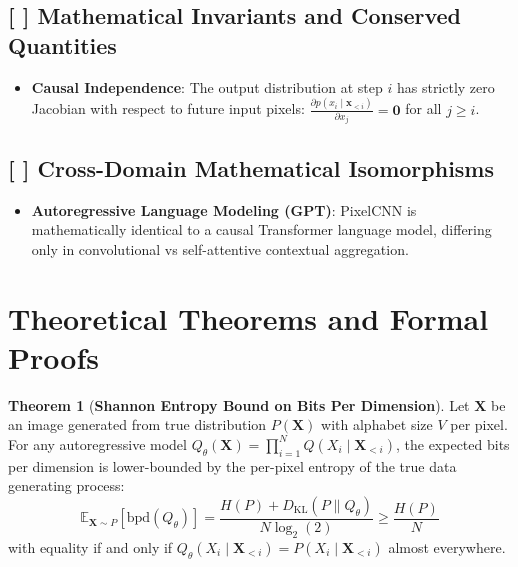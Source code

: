 \documentclass[11pt,a4paper]{article}
\theoremstyle{definition}
\newtheorem{theorem}{\textbf{Theorem}}[section]
\begin{document}
\subsection{[ ] Mathematical Invariants and Conserved Quantities}
\begin{itemize}
    \item \textbf{Causal Independence}: The output distribution at step $i$ has strictly zero Jacobian with respect to future input pixels: $\frac{\partial p(x_i \mid \mathbf{x}_{<i})}{\partial x_j} = \mathbf{0}$ for all $j \ge i$.
\end{itemize}

\subsection{[ ] Cross-Domain Mathematical Isomorphisms}
\begin{itemize}
    \item \textbf{Autoregressive Language Modeling (GPT)}: PixelCNN is mathematically identical to a causal Transformer language model, differing only in convolutional vs self-attentive contextual aggregation.
\end{itemize}

\section{Theoretical Theorems and Formal Proofs}

\begin{theorem}[\textbf{Shannon Entropy Bound on Bits Per Dimension}]
Let $\mathbf{X}$ be an image generated from true distribution $P(\mathbf{X})$ with alphabet size $V$ per pixel. For any autoregressive model $Q_\theta(\mathbf{X}) = \prod_{i=1}^N Q(X_i \mid \mathbf{X}_{<i})$, the expected bits per dimension is lower-bounded by the per-pixel entropy of the true data generating process:
{\boldmath
\begin{equation}
\mathbb{E}_{\mathbf{X} \sim P}\left[ \text{bpd}(Q_\theta) \right] = \frac{H(P) + D_{\text{KL}}(P \parallel Q_\theta)}{N \log_2(2)} \ge \frac{H(P)}{N}
\end{equation}
}
with equality if and only if $Q_\theta(X_i \mid \mathbf{X}_{<i}) = P(X_i \mid \mathbf{X}_{<i})$ almost everywhere.
\end{theorem}
\end{document}
